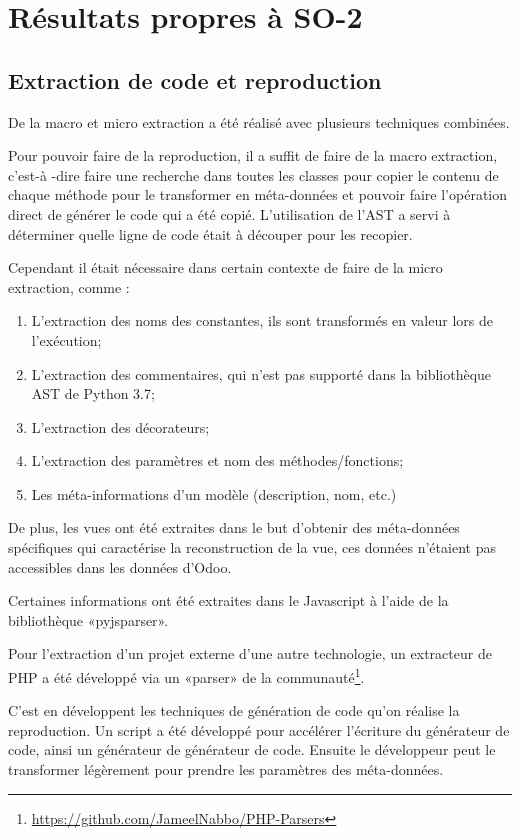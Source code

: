 \section{Résultats propres à SO-2}

\subsection {Extraction de code et reproduction}

De la macro et micro extraction a été réalisé avec plusieurs techniques combinées.

Pour pouvoir faire de la reproduction, il a suffit de faire de la macro extraction, c'est-à -dire faire une recherche dans toutes les classes pour copier le contenu de chaque méthode pour le transformer en méta-données et pouvoir faire l’opération direct de générer le code qui a été copié. L’utilisation de l’AST a servi à déterminer quelle ligne de code était à découper pour les recopier.

Cependant il était nécessaire dans certain contexte de faire de la micro extraction, comme : 
\begin{enumerate}
    \item L’extraction des noms des constantes, ils sont transformés en valeur lors de l’exécution;
    \item L’extraction des commentaires, qui n’est pas supporté dans la bibliothèque AST de Python 3.7;
    \item L’extraction des décorateurs;
    \item L’extraction des paramètres et nom des méthodes/fonctions;
    \item Les méta-informations d’un modèle (description, nom, etc.)
\end{enumerate}

De plus, les vues ont été extraites dans le but d'obtenir des méta-données spécifiques qui caractérise la reconstruction de la vue, ces données n’étaient pas accessibles dans les données d'Odoo.

Certaines informations ont été extraites dans le Javascript à l’aide de la bibliothèque «pyjsparser».

Pour l’extraction d'un projet externe d'une autre technologie, un extracteur de PHP a été développé via un «parser» de la communauté\footnote{\url{https://github.com/JameelNabbo/PHP-Parsers}}.

C'est en développent les techniques de génération de code qu'on réalise la reproduction. Un script a été développé pour accélérer l’écriture du générateur de code, ainsi un générateur de générateur de code. Ensuite le développeur peut le transformer légèrement pour prendre les paramètres des méta-données.

